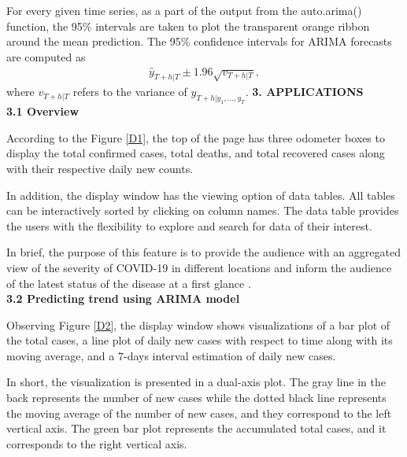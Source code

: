 \documentclass[12pt, a4paper,oneside]{book}
\theoremstyle{definition}
\begin{document}
For every given time series, as a part of the output from the auto.arima() function, the 95\% intervals are taken to plot the transparent orange ribbon around the mean prediction. The 95\% confidence intervals for ARIMA forecasts are computed as
\begin{align*}
	\hat{y}_{T+h|T} \pm 1.96\sqrt{v_{T+h|T}},
\end{align*}
where $v_{T+h|T}$ refers to the variance of $y_{T+h|y_1, \dots, y_T}$.
\vskip 0.5cm
\noindent 
{\bf 3. APPLICATIONS}\\
\noindent 
{\bf 3.1 Overview}

According to the Figure \ref{D1}, the top of the page has three odometer boxes to display the total confirmed cases, total deaths, and total recovered cases along with their respective daily new counts. 

In addition, the display window has the viewing option of data tables. All tables can be interactively sorted by clicking on column names. The data table provides the users with the flexibility to explore and search for data of their interest.

In brief, the purpose of this feature is to provide the audience with an aggregated view of the severity of COVID-19 in different locations and inform the audience of the latest status of the disease at a first glance \cite{9, 10}.\\
\noindent 
{\bf 3.2 Predicting trend using ARIMA model}

Observing Figure \ref{D2}, the display window shows visualizations of a bar plot of the total cases, a line plot of daily new cases with respect to time along with its moving average, and a 7-days interval estimation of daily new cases.

In short, the visualization is presented in a dual-axis plot. The gray line in the back represents the number of new cases while the dotted black line represents the moving average of the number of new cases, and they correspond to the left vertical axis. The green bar plot represents the accumulated total cases, and it corresponds to the right vertical axis.
\end{document}
